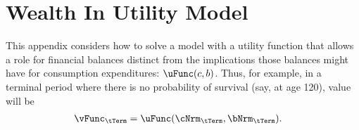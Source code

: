\documentclass[./SolvingMicroDSOPs]{subfiles}
\begin{document}
\section{Wealth In Utility Model}


\newcommand{\cdc}{\ifthenelse{\boolean{CDC}}}

\newcommand{\wealthU}{\delta}
\newcommand{\uFromC}{\acute{\uFunc}}
\newcommand{\uFromB}{\grave{\uFunc}}
\newcommand{\muInvVect}{[{\mu}^{-1}_{\tCurr}]}
\newcommand{\Rend}{\tilde}

\newcommand{\beginWithb}{0\epsilon}
\newcommand{\receiveinc}{1\epsilon}
\newcommand{\calculatem}{2\epsilon}
\newcommand{\choosecons}{3\epsilon}
\newcommand{\calculatea}{4\epsilon}
\newcommand{\chooserisk}{5\epsilon}
\newcommand{\definevEnd}{6\epsilon}
\newcommand{\drawreturn}{2\epsilon}
\newcommand{\calculatee}{1\epsilon}
\newcommand{\Maxed}{\accentset{*}}


This appendix considers how to solve a model with a utility function that allows a role for financial balances distinct from the implications those balances might have for consumption expenditures: $\uFunc(c,b)$.  Thus, for example, in a terminal period where there is no probability of survival (say, at age 120), value will be 
\begin{align}
  \vFunc_{\tTerm} & = \uFunc(\cNrm_{\tTerm},\bNrm_{\tTerm}).
\end{align}
\end{document}

